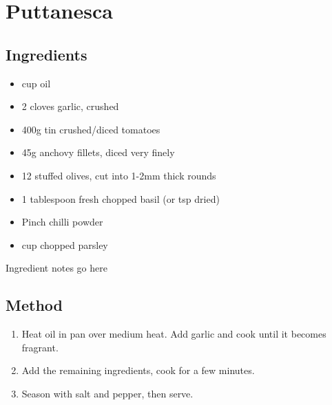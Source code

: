 \section{Puttanesca}


\subsection{Ingredients}

\begin{itemize}
    \item {} cup oil
    \item 2 cloves garlic, crushed
    \item 400g tin crushed/diced tomatoes
    \item 45g anchovy fillets, diced very finely
    \item 12 stuffed olives, cut into 1-2mm thick rounds
    \item 1 tablespoon fresh chopped basil (or  tsp dried)
    \item Pinch chilli powder
    \item {} cup chopped parsley
\end{itemize}

Ingredient notes go here

\subsection{Method}

\begin{enumerate}
    \item Heat oil in pan over medium heat. Add garlic and cook until it becomes fragrant.
    \item Add the remaining ingredients, cook for a few minutes.
    \item Season with salt and pepper, then serve.
\end{enumerate}
